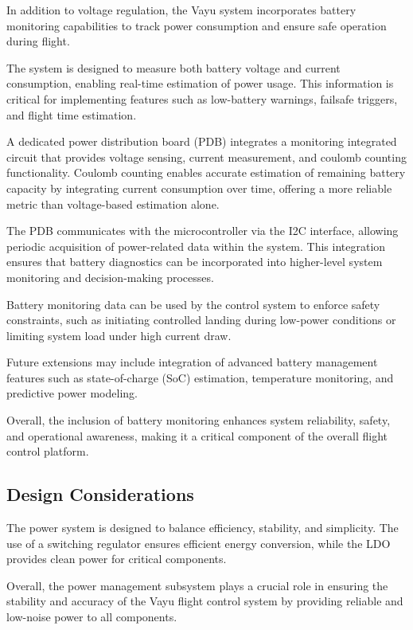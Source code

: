 In addition to voltage regulation, the Vayu system incorporates battery monitoring capabilities to track power consumption and ensure safe operation during flight.

The system is designed to measure both battery voltage and current consumption, enabling real-time estimation of power usage. This information is critical for implementing features such as low-battery warnings, failsafe triggers, and flight time estimation.

A dedicated power distribution board (PDB) integrates a monitoring integrated circuit that provides voltage sensing, current measurement, and coulomb counting functionality. Coulomb counting enables accurate estimation of remaining battery capacity by integrating current consumption over time, offering a more reliable metric than voltage-based estimation alone.

The PDB communicates with the microcontroller via the I2C interface, allowing periodic acquisition of power-related data within the system. This integration ensures that battery diagnostics can be incorporated into higher-level system monitoring and decision-making processes.

Battery monitoring data can be used by the control system to enforce safety constraints, such as initiating controlled landing during low-power conditions or limiting system load under high current draw.

Future extensions may include integration of advanced battery management features such as state-of-charge (SoC) estimation, temperature monitoring, and predictive power modeling.

Overall, the inclusion of battery monitoring enhances system reliability, safety, and operational awareness, making it a critical component of the overall flight control platform.

\subsection{Design Considerations}

The power system is designed to balance efficiency, stability, and simplicity. The use of a switching regulator ensures efficient energy conversion, while the LDO provides clean power for critical components.

Overall, the power management subsystem plays a crucial role in ensuring the stability and accuracy of the Vayu flight control system by providing reliable and low-noise power to all components.